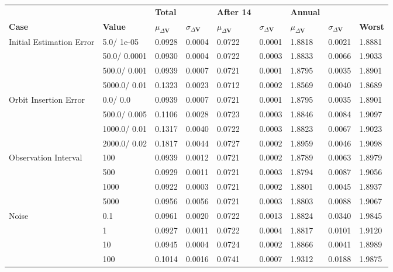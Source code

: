 \begin{table}[H]
\centering
\begin{tabular}{lllllllll}
 &  & \cellcolor[HTML]{EFEFEF}\textbf{Total} &  & \cellcolor[HTML]{EFEFEF}\textbf{After 14} & & \cellcolor[HTML]{EFEFEF}\textbf{Annual} & &\\
\rowcolor[HTML]{EFEFEF} 
\textbf{Case} & \textbf{Value} & \textbf{$\mu_{\Delta \boldsymbol{V}}$} & \textbf{$\sigma_{\Delta \boldsymbol{V}}$} & \textbf{$\mu_{\Delta \boldsymbol{V}}$} & \textbf{$\sigma_{\Delta \boldsymbol{V}}$} & \textbf{$\mu_{\Delta \boldsymbol{V}}$} & \textbf{$\sigma_{\Delta \boldsymbol{V}}$} & \textbf{Worst} \\ 
Initial Estimation Error & 5.0/
1e-05 & 0.0928 & 0.0004 & 0.0722 & 0.0001 & 1.8818 & 0.0021 & 1.8881 \\ 
 & 50.0/
0.0001 & 0.0930 & 0.0004 & 0.0722 & 0.0003 & 1.8833 & 0.0066 & 1.9033 \\ 
 & 500.0/
0.001 & 0.0939 & 0.0007 & 0.0721 & 0.0001 & 1.8795 & 0.0035 & 1.8901 \\ 
 & 5000.0/
0.01 & 0.1323 & 0.0023 & 0.0712 & 0.0002 & 1.8569 & 0.0040 & 1.8689 \\ 
Orbit Insertion Error & 0.0/
0.0 & 0.0939 & 0.0007 & 0.0721 & 0.0001 & 1.8795 & 0.0035 & 1.8901 \\ 
 & 500.0/
0.005 & 0.1106 & 0.0028 & 0.0723 & 0.0003 & 1.8846 & 0.0084 & 1.9097 \\ 
 & 1000.0/
0.01 & 0.1317 & 0.0040 & 0.0722 & 0.0003 & 1.8823 & 0.0067 & 1.9023 \\ 
 & 2000.0/
0.02 & 0.1817 & 0.0044 & 0.0727 & 0.0002 & 1.8959 & 0.0046 & 1.9098 \\ 
Observation Interval & 100 & 0.0939 & 0.0012 & 0.0721 & 0.0002 & 1.8789 & 0.0063 & 1.8979 \\ 
 & 500 & 0.0929 & 0.0011 & 0.0721 & 0.0003 & 1.8794 & 0.0087 & 1.9056 \\ 
 & 1000 & 0.0922 & 0.0003 & 0.0721 & 0.0002 & 1.8801 & 0.0045 & 1.8937 \\ 
 & 5000 & 0.0956 & 0.0056 & 0.0721 & 0.0003 & 1.8803 & 0.0088 & 1.9067 \\ 
Noise & 0.1 & 0.0961 & 0.0020 & 0.0722 & 0.0013 & 1.8824 & 0.0340 & 1.9845 \\ 
 & 1 & 0.0927 & 0.0011 & 0.0722 & 0.0004 & 1.8817 & 0.0101 & 1.9120 \\ 
 & 10 & 0.0945 & 0.0004 & 0.0724 & 0.0002 & 1.8866 & 0.0041 & 1.8989 \\ 
 & 100 & 0.1014 & 0.0016 & 0.0741 & 0.0007 & 1.9312 & 0.0188 & 1.9875 \\ 

\end{tabular}
\end{table}
